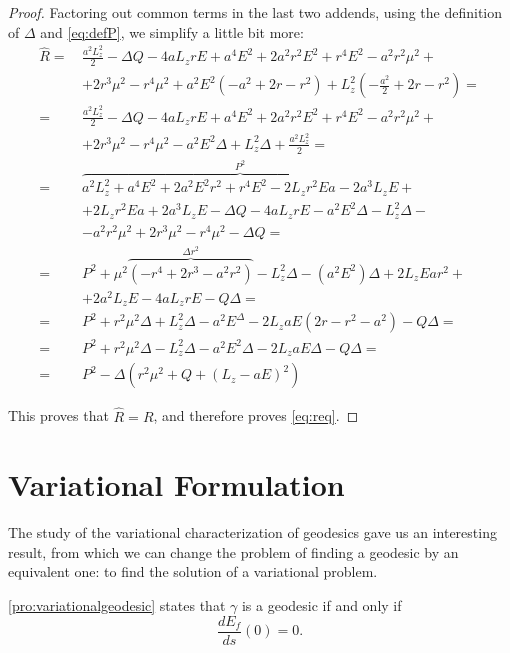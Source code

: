 \begin{proof}
	Factoring out common terms in the last two addends, using the definition of $\Delta$ and \autoref{eq:defP}, we simplify a little bit more:
	\begin{align}
	\widehat{R} =\,& \frac{a^2L_z^2}{2} - \Delta Q - 4aL_zrE + a^4E^2 + 2a^2r^2E^2 + r^4E^2 - a^2r^2\mu^2 + \nonumber \\
	&+ 2r^3\mu^2 - r^4\mu^2 + a^2E^2\left(-a^2 + 2r - r^2 \right) + L_z^2\left( -\frac{a^2}{2} + 2r - r^2 \right) = \nonumber \\
	=\,& \frac{a^2L_z^2}{2} - \Delta Q - 4aL_zrE + a^4E^2 + 2a^2r^2E^2 + r^4E^2 - a^2r^2\mu^2 + \nonumber \\
	&+ 2r^3\mu^2 - r^4\mu^2 - a^2E^2\Delta + L_z^2\Delta + \frac{a^2L_z^2}{2} = \nonumber \\
	=\,& \overbrace{a^2L_z^2 + a^4E^2 + 2a^2E^2r^2 + r^4E^2 - 2L_zr^2Ea - 2a^3L_zE}^{P^2} + \nonumber\\
	&+ 2L_zr^2Ea + 2a^3L_zE - \Delta Q - 4aL_zrE - a^2E^2\Delta - L_z^2\Delta - \nonumber \\
	&- a^2r^2\mu^2 + 2r^3\mu^2 - r^4\mu^2 - \Delta Q = \nonumber \\
	=\,& P^2 + \mu^2\overbrace{\left( -r^4 + 2r^3 - a^2r^2 \right)}^{\Delta r^2} - L_z^2\Delta - (a^2E^2)\Delta + 2L_zEar^2 + \nonumber\\
	&+ 2a^2L_zE - 4aL_zrE - Q\Delta = \nonumber\\
	=\,& P^2 + r^2\mu^2\Delta + L_z^2\Delta - a^2E^\Delta - 2L_zaE\left(2r - r^2 - a^2\right) - Q\Delta = \nonumber\\
	=\,& P^2 + r^2\mu^2\Delta - L_z^2 \Delta - a^2E^2\Delta - 2L_zaE\Delta - Q\Delta = \nonumber \\
	=\,& P^2 - \Delta \left( r^2\mu^2 + Q + \left(L_z - aE \right)^2 \right)
	\end{align}
	
	This proves that $\widehat{R} = R$, and therefore proves \autoref{eq:req}.
\end{proof}

	
\section{Variational Formulation}
\label{sec:variational}

The study of the variational characterization of geodesics gave us an interesting result, from which we can change the problem of finding a geodesic by an equivalent one: to find the solution of a variational problem.

\autoref{pro:variationalgeodesic} states that $\gamma$ is a geodesic if and only if
\[
\frac{dE_f}{ds}(0) = 0.
\]

